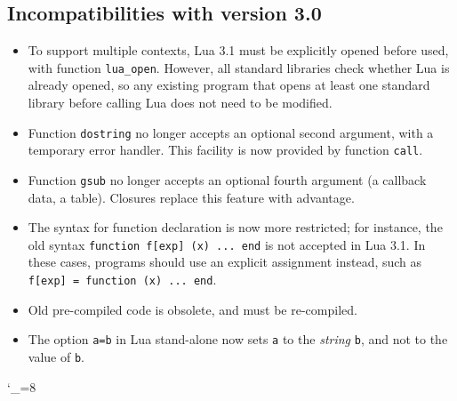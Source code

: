 \documentclass[11pt]{article}
\newcommand{\M}[1]{\emph{#1}}
\newcommand{\Index}[1]{#1\index{#1}}
\begin{document}
\subsection*{Incompatibilities with \Index{version 3.0}}
\begin{itemize}

\item To support multiple contexts,
Lua 3.1 must be explicitly opened before used,
with function \verb|lua_open|.
However, all standard libraries check whether Lua is already opened,
so any existing program that opens at least one standard
library before calling Lua does not need to be modified.

\item Function \verb|dostring| no longer accepts an optional second argument,
with a temporary error handler.
This facility is now provided by function \verb|call|.

\item Function \verb|gsub| no longer accepts an optional fourth argument
(a callback data, a table).
Closures replace this feature with advantage.

\item The syntax for function declaration is now more restricted;
for instance, the old syntax \verb|function f[exp] (x) ... end| is not
accepted in Lua 3.1.
In these cases,
programs should use an explicit assignment instead, such as
\verb|f[exp] = function (x) ... end|.

\item Old pre-compiled code is obsolete, and must be re-compiled.

\item The option \verb|a=b| in Lua stand-alone now sets \verb|a| to the
\M{string} \verb|b|, and not to the value of \verb|b|.

\end{itemize}

\catcode`\_=8

\newcommand{\indexentry}[2]{\item {#1} #2}
\begin{theindex}

\end{theindex}
\end{document}
